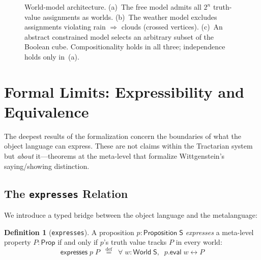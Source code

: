 \documentclass[jsl,bibother]{asl}
\theoremstyle{definition}
\newtheorem{definition}[theorem]{Definition}
\theoremstyle{remark}
\newcommand{\Sach}{\mathsf{S}}
\newcommand{\World}{\mathsf{World}}
\newcommand{\Prop}{\mathsf{Prop}}
\newcommand{\eval}{\mathsf{eval}}
\newcommand{\expresses}{\mathsf{expresses}}
\begin{document}
\begin{figure}[t]
{%
}
\caption{World-model architecture. (a)~The free model admits all
  $2^n$ truth-value assignments as worlds. (b)~The weather model
  excludes assignments violating rain $\Rightarrow$ clouds
  (crossed vertices). (c)~An abstract constrained model selects
  an arbitrary subset of the Boolean cube.  Compositionality
  holds in all three; independence holds only in~(a).}
\label{fig:worldmodels}
\end{figure}

\section{Formal Limits: Expressibility and Equivalence}
\label{sec:limits}

The deepest results of the formalization concern the boundaries
of what the object language can express.  These are not claims
within the Tractarian system but \emph{about} it---theorems at
the meta-level that formalize Wittgenstein's saying/showing
distinction.

\subsection{The \texttt{expresses} Relation}
\label{sec:expresses}

We introduce a typed bridge between the object language and the
metalanguage:

\begin{definition}[\texttt{expresses}]
\label{def:expresses}
A proposition $p : \mathsf{Proposition}\;\Sach$ \emph{expresses}
a meta-level property $P : \Prop$ if and only if $p$'s truth
value tracks $P$ in every world:
\[
  \expresses\;p\;P \;\;\stackrel{\mathrm{def}}{=}\;\;
  \forall\;w : \World\;\Sach,\;\; p.\eval\;w \leftrightarrow P
\]
\end{definition}
\end{document}
